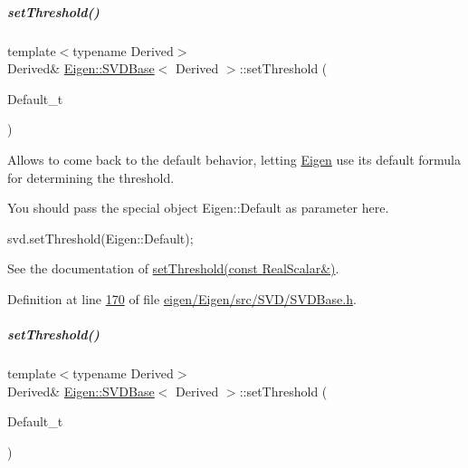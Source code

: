 \mbox{\label{group___s_v_d___module_a27586b69dbfb63f714d1d45fd6304f97}} 
\subparagraph{\texorpdfstring{set\+Threshold()}{setThreshold()}\hspace{0.1cm}{\footnotesize\ttfamily [3/4]}}
{\footnotesize\ttfamily template$<$typename Derived$>$ \\
Derived\& \hyperlink{group___s_v_d___module_class_eigen_1_1_s_v_d_base}{Eigen\+::\+S\+V\+D\+Base}$<$ Derived $>$\+::set\+Threshold (\begin{DoxyParamCaption}\item[{Default\+\_\+t}]{ }\end{DoxyParamCaption})\hspace{0.3cm}{\ttfamily [inline]}}

Allows to come back to the default behavior, letting \hyperlink{namespace_eigen}{Eigen} use its default formula for determining the threshold.

You should pass the special object Eigen\+::\+Default as parameter here. 
\begin{DoxyCode}
svd.setThreshold(Eigen::Default); 
\end{DoxyCode}


See the documentation of \hyperlink{group___s_v_d___module_a1c95d05398fc15e410a28560ef70a5a6}{set\+Threshold(const Real\+Scalar\&)}. 

Definition at line \hyperlink{eigen_2_eigen_2src_2_s_v_d_2_s_v_d_base_8h_source_l00170}{170} of file \hyperlink{eigen_2_eigen_2src_2_s_v_d_2_s_v_d_base_8h_source}{eigen/\+Eigen/src/\+S\+V\+D/\+S\+V\+D\+Base.\+h}.

\mbox{\label{group___s_v_d___module_a27586b69dbfb63f714d1d45fd6304f97}} 
\subparagraph{\texorpdfstring{set\+Threshold()}{setThreshold()}\hspace{0.1cm}{\footnotesize\ttfamily [4/4]}}
{\footnotesize\ttfamily template$<$typename Derived$>$ \\
Derived\& \hyperlink{group___s_v_d___module_class_eigen_1_1_s_v_d_base}{Eigen\+::\+S\+V\+D\+Base}$<$ Derived $>$\+::set\+Threshold (\begin{DoxyParamCaption}\item[{Default\+\_\+t}]{ }\end{DoxyParamCaption})\hspace{0.3cm}{\ttfamily [inline]}}


